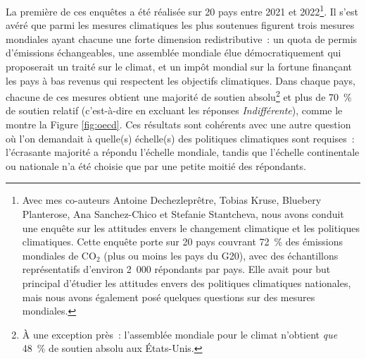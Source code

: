 \documentclass[a5paper,french,openany]{memoir}
\begin{document}
La première de ces enquêtes a été réalisée sur 20 pays %
entre 2021 et 2022\footnote{Avec mes co-auteurs Antoine Dechezleprêtre, Tobias Kruse, Bluebery Planterose, Ana Sanchez-Chico et Stefanie Stantcheva, nous avons conduit une enquête sur les attitudes envers le changement climatique et les politiques climatiques. Cette enquête porte sur 20 pays couvrant 72~\% des émissions mondiales de CO$_\text{2}$ (plus ou moins les pays du G20), avec des échantillons représentatifs d'environ 2~000 répondants par pays. Elle avait pour but principal d'étudier les attitudes envers des politiques climatiques nationales, mais nous avons également posé quelques questions sur des mesures mondiales.}. Il s'est avéré que parmi les mesures climatiques les plus soutenues figurent trois mesures mondiales ayant chacune une forte dimension redistributive~: un quota de permis d'émissions échangeables, une assemblée mondiale élue démocratiquement qui proposerait un traité sur le climat, et un impôt mondial sur la fortune finançant les pays à bas revenus qui respectent les objectifs climatiques. Dans chaque pays, chacune de ces mesures obtient une majorité de soutien absolu\footnote{À une exception près~: l'assemblée mondiale pour le climat n'obtient \textit{que} 48~\% de soutien absolu aux États-Unis.} 
et plus de 70~\% de soutien relatif (c'est-à-dire en excluant les réponses \textit{Indifférent\textperiodcentered{}e}), 
comme le montre la Figure \ref{fig:oecd}. Ces résultats sont cohérents avec une autre question où l'on demandait à quelle(s) échelle(s) des politiques climatiques sont requises~: %
l'écrasante majorité a répondu l'échelle mondiale, tandis que l'échelle continentale ou nationale n'a été choisie que par une petite moitié des répondants. 
\end{document}
